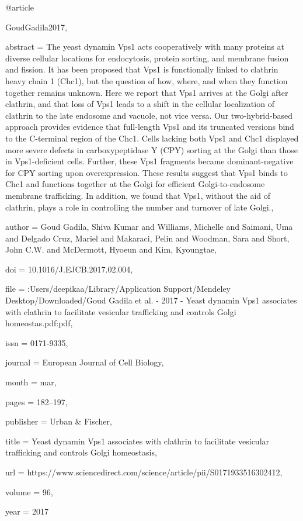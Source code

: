 @article{GoudGadila2017,

abstract = {The yeast dynamin Vps1 acts cooperatively with many proteins at diverse cellular locations for endocytosis, protein sorting, and membrane fusion and fission. It has been proposed that Vps1 is functionally linked to clathrin heavy chain 1 (Chc1), but the question of how, where, and when they function together remains unknown. Here we report that Vps1 arrives at the Golgi after clathrin, and that loss of Vps1 leads to a shift in the cellular localization of clathrin to the late endosome and vacuole, not vice versa. Our two-hybrid-based approach provides evidence that full-length Vps1 and its truncated versions bind to the C-terminal region of the Chc1. Cells lacking both Vps1 and Chc1 displayed more severe defects in carboxypeptidase Y (CPY) sorting at the Golgi than those in Vps1-deficient cells. Further, these Vps1 fragments became dominant-negative for CPY sorting upon overexpression. These results suggest that Vps1 binds to Chc1 and functions together at the Golgi for efficient Golgi-to-endosome membrane trafficking. In addition, we found that Vps1, without the aid of clathrin, plays a role in controlling the number and turnover of late Golgi.},

author = {{Goud Gadila}, Shiva Kumar and Williams, Michelle and Saimani, Uma and {Delgado Cruz}, Mariel and Makaraci, Pelin and Woodman, Sara and Short, John C.W. and McDermott, Hyoeun and Kim, Kyoungtae},

doi = {10.1016/J.EJCB.2017.02.004},

file = {:Users/deepikaa/Library/Application Support/Mendeley Desktop/Downloaded/Goud Gadila et al. - 2017 - Yeast dynamin Vps1 associates with clathrin to facilitate vesicular trafficking and controls Golgi homeostas.pdf:pdf},

issn = {0171-9335},

journal = {European Journal of Cell Biology},

month = {mar},

pages = {182--197},

publisher = {Urban {\&} Fischer},

title = {{Yeast dynamin Vps1 associates with clathrin to facilitate vesicular trafficking and controls Golgi homeostasis}},

url = {https://www.sciencedirect.com/science/article/pii/S0171933516302412},

volume = {96},

year = {2017}

}


